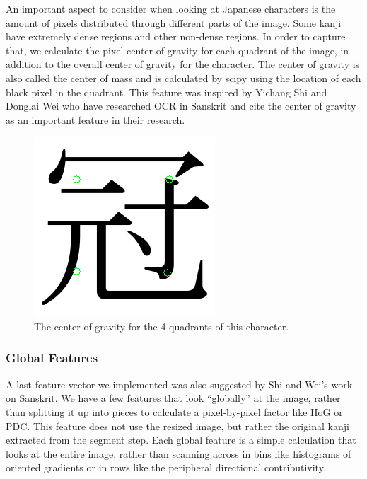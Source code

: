 \documentclass[10pt,twocolumn,letterpaper]{article}
\begin{document}
An important aspect to consider when looking at Japanese characters is the amount of pixels distributed through different parts of the image. Some kanji have extremely dense regions and other non-dense regions. In order to capture that, we calculate the pixel center of gravity for each quadrant of the image, in addition to the overall center of gravity for the character. The center of gravity is also called the center of mass and is calculated by scipy using the location of each black pixel in the quadrant. This feature was inspired by Yichang Shi and Donglai Wei who have researched OCR in Sanskrit and cite the center of gravity as an important feature in their research.

\begin{figure}[t]
    \centering
    \includegraphics[width=0.7\columnwidth]{../cog.png}
    \caption{The center of gravity for the 4 quadrants of this character.}
\end{figure}

\subsubsection{Global Features}

A last feature vector we implemented was also suggested by Shi and Wei’s work on Sanskrit. We have a few features that look “globally” at the image, rather than splitting it up into pieces to calculate a pixel-by-pixel factor like HoG or PDC. This feature does not use the resized image, but rather the original kanji extracted from the segment step. Each global feature is a simple calculation that looks at the entire image, rather than scanning across in bins like histograms of oriented gradients or in rows like the peripheral directional contributivity.
\end{document}
